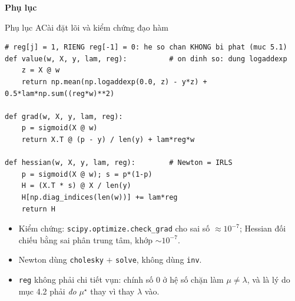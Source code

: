 \documentclass[aspectratio=169,11pt]{beamer}
\begin{document}
\begin{frame}[plain]
  \begin{center}{\Large\color{accent}\textbf{Phụ lục}}\end{center}
\end{frame}

\begin{frame}[fragile]{Phụ lục A}{Cài đặt lõi và kiểm chứng đạo hàm}
\begin{lstlisting}
# reg[j] = 1, RIENG reg[-1] = 0: he so chan KHONG bi phat (muc 5.1)
def value(w, X, y, lam, reg):          # on dinh so: dung logaddexp
    z = X @ w
    return np.mean(np.logaddexp(0.0, z) - y*z) + 0.5*lam*np.sum((reg*w)**2)

def grad(w, X, y, lam, reg):
    p = sigmoid(X @ w)
    return X.T @ (p - y) / len(y) + lam*reg*w

def hessian(w, X, y, lam, reg):        # Newton = IRLS
    p = sigmoid(X @ w); s = p*(1-p)
    H = (X.T * s) @ X / len(y)
    H[np.diag_indices(len(w))] += lam*reg
    return H
\end{lstlisting}
  \footnotesize
  \begin{itemize}
    \item Kiểm chứng: \texttt{scipy.optimize.check\_grad} cho sai số $\approx10^{-7}$;
          Hessian đối chiếu bằng sai phân trung tâm, khớp $\sim10^{-7}$.
    \item Newton dùng \texttt{cholesky} $+$ \texttt{solve}, không dùng \texttt{inv}.
    \item \texttt{reg} không phải chi tiết vụn: chính số $0$ ở hệ số chặn làm $\mu\ne\lambda$, và
          là lý do mục 4.2 phải \emph{đo} $\mu^\star$ thay vì thay $\lambda$ vào.
  \end{itemize}
\end{frame}
\end{document}
